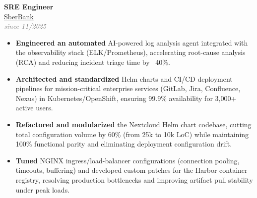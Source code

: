 \documentclass[10pt, a4paper]{article}
\begin{document}

\begin{minipage}[t]{0.55\textwidth}

\raggedright



\hspace{0.5cm}
\begin{minipage}[t]{0.9\textwidth}
  \raggedright
  \textbf{\Large SRE Engineer} \\[2pt]
  \textcolor{graytext}{\href{https://www.sberbank.ru/ru/person}{SberBank}}\extlink \\
  \textcolor{graytext}{\textit{since 11/2025}}
  \begin{itemize}
      \item \textbf{Engineered an automated} AI-powered log analysis agent integrated with the observability stack (ELK/Prometheus), accelerating root-cause analysis (RCA) and reducing incident triage time by ~40\%.
      \item \textbf{Architected and standardized} Helm charts and CI/CD deployment pipelines for mission-critical enterprise services (GitLab, Jira, Confluence, Nexus) in Kubernetes/OpenShift, ensuring 99.9\% availability for 3,000+ active users.
      \item \textbf{Refactored and modularized} the Nextcloud Helm chart codebase, cutting total configuration volume by 60\% (from 25k to 10k LoC) while maintaining 100\% functional parity and eliminating deployment configuration drift.
      \item \textbf{Tuned} NGINX ingress/load-balancer configurations (connection pooling, timeouts, buffering) and developed custom patches for the Harbor container registry, resolving production bottlenecks and improving artifact pull stability under peak loads.
  \end{itemize}
\end{minipage}

\vspace{1cm}


\end{minipage}
\end{document}
